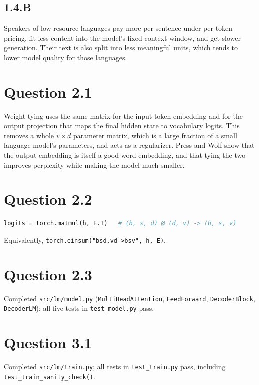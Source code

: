 \documentclass{article}
\begin{document}
\subsection*{1.4.B}
Speakers of low-resource languages pay more per sentence under per-token pricing, fit less content into the model's fixed context window, and get slower generation. Their text is also split into less meaningful units, which tends to lower model quality for those languages.

\section*{Question 2.1}
Weight tying uses the same matrix for the input token embedding and for the output projection that maps the final hidden state to vocabulary logits. This removes a whole $v \times d$ parameter matrix, which is a large fraction of a small language model's parameters, and acts as a regularizer. Press and Wolf show that the output embedding is itself a good word embedding, and that tying the two improves perplexity while making the model much smaller.

\section*{Question 2.2}
\begin{lstlisting}[language=Python]
logits = torch.matmul(h, E.T)   # (b, s, d) @ (d, v) -> (b, s, v)
\end{lstlisting}
Equivalently, \texttt{torch.einsum("bsd,vd->bsv", h, E)}.

\section*{Question 2.3}
Completed \texttt{src/lm/model.py} (\texttt{MultiHeadAttention}, \texttt{FeedForward}, \texttt{DecoderBlock}, \texttt{DecoderLM}); all five tests in \texttt{test\_model.py} pass.

\section*{Question 3.1}
Completed \texttt{src/lm/train.py}; all tests in \texttt{test\_train.py} pass, including \texttt{test\_train\_sanity\_check()}.
\end{document}
